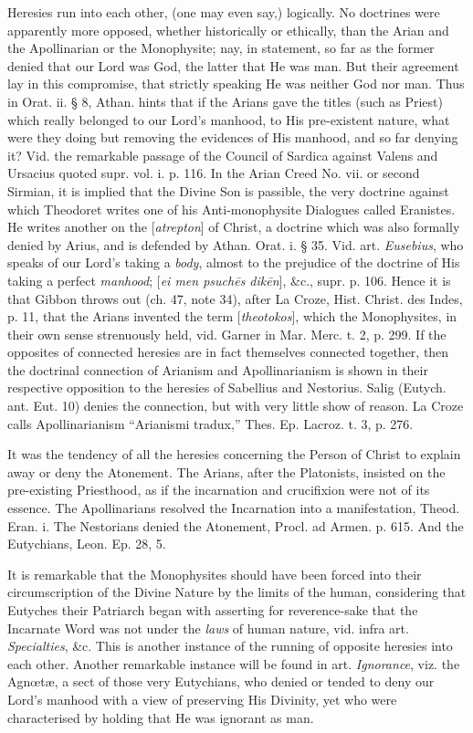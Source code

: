 Heresies run into each other, (one may even say,)
logically. No doctrines were apparently more opposed, whether
historically or ethically, than the Arian and the Apollinarian or the
Monophysite; nay, in statement, so far as the former denied that our
Lord was God, the latter that He was man. But their agreement lay in
this compromise, that strictly speaking He was neither God nor man.
Thus in Orat. ii. § 8, Athan. hints that if the Arians gave the
titles (such as Priest) which really belonged to our Lord's manhood,
to His pre-existent nature, what were they doing but removing the
evidences of His manhood, and so far denying it? Vid. the remarkable
passage of the Council of Sardica against Valens and Ursacius quoted
supr. vol. i. p. 116. In the Arian Creed No. vii. or second Sirmian,
it is implied that the Divine Son is passible, the very doctrine
against which Theodoret writes one of his Anti-monophysite Dialogues
called Eranistes. He writes another on the [\emph{atrepton}]
of Christ, a doctrine which was also formally denied by Arius,
and is defended by Athan. Orat. i. § 35. Vid. art. \emph{Eusebius},
who speaks of our Lord's taking a \emph{body},
almost to the prejudice of the doctrine of His taking a perfect \emph{manhood}; [\emph{ei
men psuch\={e}s dik\={e}n}],
\&c., supr. p. 106. Hence it is that Gibbon throws out (ch. 47,
note 34), after La Croze, Hist. Christ. des Indes, p. 11, that the
Arians invented the term [\emph{theotokos}],
which the Monophysites, in their own sense strenuously held,
vid. Garner in Mar. Merc. t. 2, p. 299. If the opposites of connected
heresies are in fact themselves connected together, then the doctrinal
connection of Arianism and Apollinarianism is shown in their
respective opposition to the heresies of Sabellius and Nestorius.
Salig (Eutych. ant. Eut. 10) denies the connection, but with very
little show of reason. La Croze calls Apollinarianism ``Arianismi
tradux,'' Thes. Ep. Lacroz. t. 3, p. 276.

It was the tendency of all the heresies
concerning the Person of Christ to explain away or deny the Atonement.
The Arians, after the Platonists, insisted on the pre-existing
Priesthood, as if the incarnation and crucifixion were not of its
essence. The Apollinarians resolved the Incarnation into a
manifestation, Theod. Eran. i. The Nestorians denied the Atonement,
Procl. ad Armen. p. 615. And the Eutychians, Leon. Ep. 28, 5.

It is remarkable that the Monophysites should
have been forced into their circumscription of the Divine Nature by
the limits of the human, considering that Eutyches their Patriarch
began with asserting for reverence-sake that the Incarnate Word was
not under the \emph{laws} of human nature, vid. infra art. \emph{Specialties}, \&c. This is another instance of the running of
opposite heresies into each other. Another remarkable instance will be
found in art. \emph{Ignorance},
viz. the Agnœtæ, a sect of those very Eutychians, who denied or
tended to deny our Lord's manhood with a view of preserving His
Divinity, yet who were characterised by holding that He was ignorant
as man.

